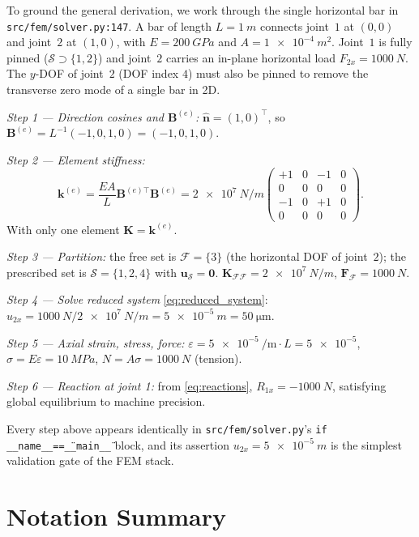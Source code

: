 To ground the general derivation, we work through the single
horizontal bar in \texttt{src/fem/solver.py:147}. A bar of length
$L=\SI{1}{m}$ connects joint~$1$ at $(0,0)$ and joint~$2$ at
$(1,0)$, with $E=\SI{200}{GPa}$ and
$A=\SI{1e-4}{m^2}$. Joint~$1$ is fully pinned ($\mathcal{S}\supset\{1,2\}$)
and joint~$2$ carries an in-plane horizontal load $F_{2x}=\SI{1000}{N}$.
The $y$-DOF of joint~$2$ (DOF index $4$) must also be pinned to
remove the transverse zero mode of a single bar in 2D.

\emph{Step 1 --- Direction cosines and $\mathbf{B}^{(e)}$:}
$\hat{\mathbf{n}}=(1,0)^\top$, so
$\mathbf{B}^{(e)}=L^{-1}(-1,0,1,0)=(-1,0,1,0)$.

\emph{Step 2 --- Element stiffness:}
\[
  \mathbf{k}^{(e)}
  =\frac{EA}{L}\mathbf{B}^{(e)\top}\mathbf{B}^{(e)}
  =\SI{2e7}{N/m}\begin{pmatrix}
    +1 & 0 & -1 & 0\\ 0 & 0 & 0 & 0\\
    -1 & 0 & +1 & 0\\ 0 & 0 & 0 & 0
  \end{pmatrix}.
\]
With only one element $\mathbf{K}=\mathbf{k}^{(e)}$.

\emph{Step 3 --- Partition:} the free set is
$\mathcal{F}=\{3\}$ (the horizontal DOF of joint~$2$); the
prescribed set is $\mathcal{S}=\{1,2,4\}$ with
$\mathbf{u}_{\mathcal{S}}=\mathbf{0}$.
$\mathbf{K}_{\mathcal{F}\mathcal{F}}=\SI{2e7}{N/m}$,
$\mathbf{F}_{\mathcal{F}}=\SI{1000}{N}$.

\emph{Step 4 --- Solve reduced system}
\cref{eq:reduced_system}:
$u_{2x}=\SI{1000}{N}/\SI{2e7}{N/m}=\SI{5e-5}{m}=\SI{50}{\micro\metre}$.

\emph{Step 5 --- Axial strain, stress, force:}
$\varepsilon=\SI{5e-5}{\per\metre}\cdot L=\num{5e-5}$,
$\sigma=E\varepsilon=\SI{10}{MPa}$,
$N=A\sigma=\SI{1000}{N}$ (tension).

\emph{Step 6 --- Reaction at joint 1:} from
\cref{eq:reactions}, $R_{1x}=-\SI{1000}{N}$, satisfying
global equilibrium to machine precision.

Every step above appears identically in
\texttt{src/fem/solver.py}'s
\texttt{if \_\_name\_\_==\"\_\_main\_\_\"} block, and its
assertion $u_{2x}=\SI{5e-5}{m}$ is the simplest validation gate
of the FEM stack.

\section{Notation Summary}
\label{app:fem:notation}

